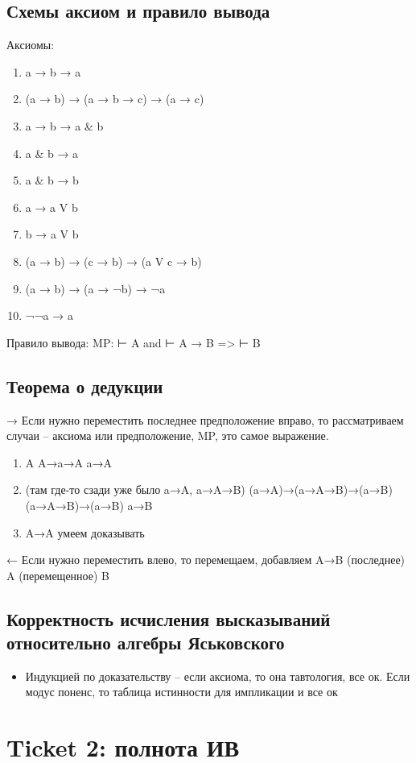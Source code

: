 \documentclass[11pt]{article}
\begin{document}
\subsection{Схемы аксиом и правило вывода}
\label{sec-3-3}
Аксиомы:
\begin{enumerate}
\item a → b → a
\item (a → b) → (a → b → c) → (a → c)
\item a → b → a \& b
\item a \& b → a
\item a \& b → b
\item a → a V b
\item b → a V b
\item (a → b) → (c → b) → (a V c → b)
\item (a → b) → (a → ¬b) → ¬a
\item ¬¬a → a
\end{enumerate}

Правило вывода:
MP: ⊢ A and ⊢ A → B => ⊢ B
\subsection{Теорема о дедукции}
\label{sec-3-4}
→ Если нужно переместить последнее предположение вправо,
то рассматриваем случаи -- аксиома или предположение,
MP, это самое выражение.
\begin{enumerate}
\item A
A→a→A
a→A
\item (там где-то сзади уже было a→A, a→A→B)
(a→A)→(a→A→B)→(a→B)
(a→A→B)→(a→B)
a→B
\item A→A умеем доказывать
\end{enumerate}

← Если нужно переместить влево, то перемещаем, добавляем
A→B (последнее)
A    (перемещенное)
B
\subsection{Корректность исчисления высказываний относительно алгебры Яськовского}
\label{sec-3-5}
\begin{itemize}
\item Индукцией по доказательству -- если аксиома, то она
тавтология, все ок. Если модус поненс, то таблица
истинности для импликации и все ок
\end{itemize}
\section{Ticket 2: полнота ИВ}
\label{sec-4}
\end{document}
